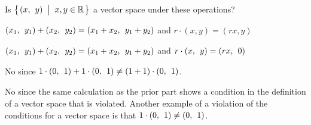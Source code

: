 
\begin{Exercise}[
name={},
title={}, 
difficulty=0,
origin={\cite{JH}}]

Is \( \set{\rowvec{x,&y}\suchthat x,y\in\Re} \) a vector space under
these operations?

\Question \( \rowvec{x_1,&y_1}+\rowvec{x_2,&y_2}=\rowvec{x_1+x_2,&y_1+y_2} \)
and \( r\cdot (x,y)=(rx,y) \)

\Question \( \rowvec{x_1,&y_1}+\rowvec{x_2,&y_2}=\rowvec{x_1+x_2,&y_1+y_2} \)
and \( r\cdot \rowvec{x,&y}=\rowvec{rx,&0} \)

\end{Exercise}

\begin{Answer}
\Question No since \( 1\cdot\rowvec{0,&1}+1\cdot\rowvec{0,&1}\neq (1+1)\cdot\rowvec{0,&1} \).

\Question No since the same calculation as the prior part shows
a condition in the definition of a vector space that is
violated.
Another example of a violation of the conditions for a
vector space is that \( 1\cdot \rowvec{0,&1} \neq \rowvec{0,&1} \).


\end{Answer}
